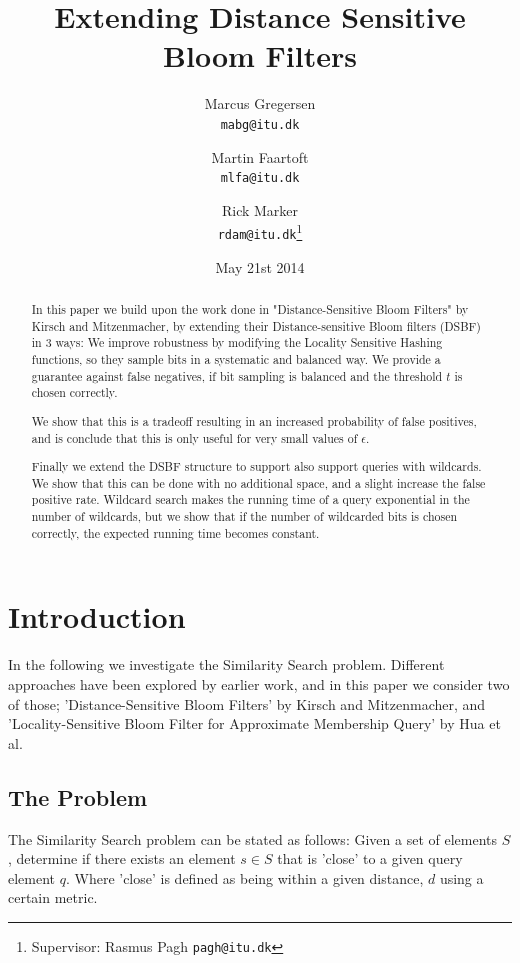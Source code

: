 \documentclass[a4paper,11pt]{article}
\begin{document}
\graphicspath{ {./images/} }
\date{May 21st 2014}
\title{Extending Distance Sensitive Bloom Filters}

\author{Marcus Gregersen\\
\texttt{mabg@itu.dk}
\and Martin Faartoft\\
\texttt{mlfa@itu.dk}
\and Rick Marker\\
\texttt{rdam@itu.dk}\thanks{Supervisor: Rasmus Pagh \texttt{pagh@itu.dk}}}
\clearpage\maketitle
\thispagestyle{empty}
\setcounter{page}{1}
\begin{abstract}
In this paper we build upon the work done in "Distance-Sensitive Bloom Filters"\cite{paper:harvard} by Kirsch and Mitzenmacher, by extending their Distance-sensitive Bloom filters (DSBF) in 3 ways:
We improve robustness by modifying the Locality Sensitive Hashing functions, so they sample bits in a systematic and balanced way. We provide a guarantee against false negatives, if bit sampling is balanced and the threshold $t$ is chosen correctly.

 We show that this is a tradeoff resulting in an increased probability of false positives, and is conclude that this is only useful for very small values of $\epsilon$.


Finally we extend the DSBF structure to support also support queries with wildcards. We show that this can be done with no additional space, and a slight increase the false positive rate. Wildcard search makes the running time of a query exponential in the number of wildcards, but we show that if the number of wildcarded bits is chosen correctly, the expected running time becomes constant.
\end{abstract}

\newpage
\setcounter{page}{1}

\section{Introduction}
In the following we investigate the Similarity Search problem. Different approaches have been explored by earlier work, and in this paper we consider two of those; 'Distance-Sensitive Bloom Filters'\cite{paper:harvard} by Kirsch and Mitzenmacher, and 'Locality-Sensitive Bloom Filter for Approximate Membership Query'\cite{paper:hua} by Hua et al.

\subsection{The Problem}
The Similarity Search problem can be stated as follows: Given a set of elements $S$, determine if there exists an element $s \in S$ that is 'close' to a given query element $q$. Where 'close' is defined as being within a given distance, $d$ using a certain metric.
\end{document}
